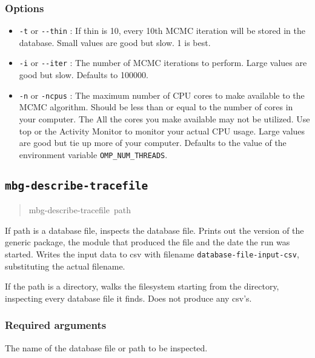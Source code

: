 \subsubsection{Options%
}
%
\begin{itemize}

\item \texttt{-t} or \texttt{-{}-thin} : If thin is 10, every 10th MCMC iteration will be stored in the
database. Small values are good but slow. 1 is best.

\item \texttt{-i} or \texttt{-{}-iter} : The number of MCMC iterations to perform. Large values are good
but slow. Defaults to 100000.

\item \texttt{-n} or \texttt{-ncpus} : The maximum number of CPU cores to make available to the MCMC
algorithm. Should be less than or equal to the number of cores in your computer. The
All the cores you make available may not be utilized. Use top or the Activity Monitor
to monitor your actual CPU usage. Large values are good but tie up more of your computer.
Defaults to the value of the environment variable \texttt{OMP\_NUM\_THREADS}.

\end{itemize}




\subsection{\texttt{mbg-describe-tracefile}%
}
%
\begin{quote}{\ttfamily \raggedright \noindent
mbg-describe-tracefile~path
}
\end{quote}

If path is a database file, inspects the database file. Prints out the version of the
generic package, the module that produced the file and the date the run was started.
Writes the input data to csv with filename \texttt{database-file-input-csv}, substituting
the actual filename.

If the path is a directory, walks the filesystem starting from the directory, inspecting
every database file it finds. Does not produce any csv's.




\subsubsection{Required arguments%
}
\setcounter{listcnt0}{0}
\begin{list}{.}
{
\setlength{\rightmargin}{\leftmargin}
}

\item The name of the database file or path to be inspected.
\end{list}




